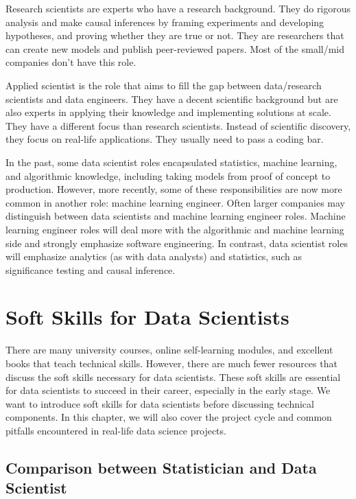 \documentclass[
  12pt,
]{krantz}
\begin{document}
Research scientists are experts who have a research background. They do rigorous analysis and make causal inferences by framing experiments and developing hypotheses, and proving whether they are true or not. They are researchers that can create new models and publish peer-reviewed papers. Most of the small/mid companies don't have this role.

Applied scientist is the role that aims to fill the gap between data/research scientists and data engineers. They have a decent scientific background but are also experts in applying their knowledge and implementing solutions at scale. They have a different focus than research scientists. Instead of scientific discovery, they focus on real-life applications. They usually need to pass a coding bar.

In the past, some data scientist roles encapsulated statistics, machine learning, and algorithmic knowledge, including taking models from proof of concept to production. However, more recently, some of these responsibilities are now more common in another role: machine learning engineer. Often larger companies may distinguish between data scientists and machine learning engineer roles. Machine learning engineer roles will deal more with the algorithmic and machine learning side and strongly emphasize software engineering. In contrast, data scientist roles will emphasize analytics (as with data analysts) and statistics, such as significance testing and causal inference.

\hypertarget{SoftSkillsforDataScientists}{%
\chapter{Soft Skills for Data Scientists}\label{SoftSkillsforDataScientists}}

There are many university courses, online self-learning modules, and excellent books that teach technical skills. However, there are much fewer resources that discuss the soft skills necessary for data scientists. These soft skills are essential for data scientists to succeed in their career, especially in the early stage. We want to introduce soft skills for data scientists before discussing technical components. In this chapter, we will also cover the project cycle and common pitfalls encountered in real-life data science projects.

\hypertarget{comparison-between-statistician-and-data-scientist}{%
\section{Comparison between Statistician and Data Scientist}\label{comparison-between-statistician-and-data-scientist}}
\end{document}
